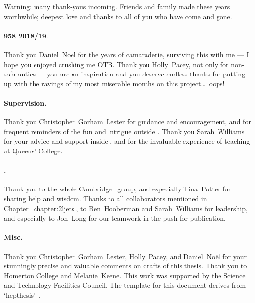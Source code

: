 \begin{acknowledgements}
Warning: many thank-yous incoming.
Friends and family made these years worthwhile;
deepest love and thanks to all of you who have come and gone.

\paragraph{958 2018/19.}
Thank you Daniel~Noel for the years of camaraderie, surviving this with me
--- I hope you enjoyed crushing me OTB.
Thank you Holly~Pacey, not only for non-sofa antics
--- you are an inspiration and you deserve endless thanks for putting up
with the ravings of my most miserable months on this project\ldots\ oops!

\paragraph{Supervision.}
Thank you Christopher~Gorham~Lester for guidance and encouragement,
and for frequent reminders of the fun and intrigue outside \atlas.
Thank you Sarah~Williams for your advice and support inside \atlas, and
for the invaluable experience of teaching at Queens' College.

\paragraph{\atlas.}
Thank you to the whole Cambridge \atlas\ group, and especially Tina~Potter for
sharing help and wisdom.
Thanks to all collaborators mentioned in Chapter~\ref{chapter:2ljets},
to Ben~Hooberman and Sarah~Williams for leadership, and especially to
Jon~Long for our teamwork in the push for publication,

\paragraph{Misc.}
Thank you Christopher~Gorham~Lester, Holly~Pacey, and Daniel~No\"el for your
stunningly precise and valuable comments on drafts of this thesis.
Thank you to Homerton College and Melanie~Keene.
This work was supported by the Science and Technology Facilities Council.
The template for this document derives from `hepthesis'~\cite{hepthesis}.
\end{acknowledgements}


